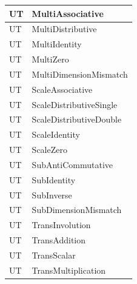\documentclass[12pt, titlepage]{article}
\newcounter{unitTest}
\newcommand{\mtheunitTest}{UT\theunitTest}
\begin{document}
{\begin{longtable}{|p{2cm}|p{11cm}|}
    {unitTest} \mtheunitTest \label{MultiAssociative} &
    MultiAssociative \\ \hline
    {unitTest} \mtheunitTest \label{MultiDistributive} &
    MultiDistributive \\ \hline
    {unitTest} \mtheunitTest \label{MultiIdentity} &
    MultiIdentity \\ \hline
    {unitTest} \mtheunitTest \label{MultiZero} & MultiZero \\
    \hline
    {unitTest} \mtheunitTest \label{MultiDimensionMismatch} &
    MultiDimensionMismatch \\ \hline

    {unitTest} \mtheunitTest \label{ScaleAssociative} &
    ScaleAssociative \\ \hline
    {unitTest} \mtheunitTest \label{ScaleDistributiveSingle} &
    ScaleDistributiveSingle \\ \hline
    {unitTest} \mtheunitTest \label{ScaleDistributiveDouble} &
    ScaleDistributiveDouble \\ \hline
    {unitTest} \mtheunitTest \label{ScaleIdentity} &
    ScaleIdentity \\ \hline
    {unitTest} \mtheunitTest \label{ScaleZero} & ScaleZero \\
    \hline

    {unitTest} \mtheunitTest \label{SubAntiCommutative} &
    SubAntiCommutative \\ \hline
    {unitTest} \mtheunitTest \label{SubIdentity} & SubIdentity \\
    \hline
    {unitTest} \mtheunitTest \label{SubInverse} & SubInverse \\
    \hline
    {unitTest} \mtheunitTest \label{SubDimensionMismatch} &
    SubDimensionMismatch \\ \hline

    {unitTest} \mtheunitTest \label{TransInvolution} &
    TransInvolution \\ \hline
    {unitTest} \mtheunitTest \label{TransAddition} &
    TransAddition \\ \hline
    {unitTest} \mtheunitTest \label{TransScalar} & TransScalar \\
    \hline
    {unitTest} \mtheunitTest \label{TransMultiplication} &
    TransMultiplication \\ \hline


\end{longtable}}
\end{document}

